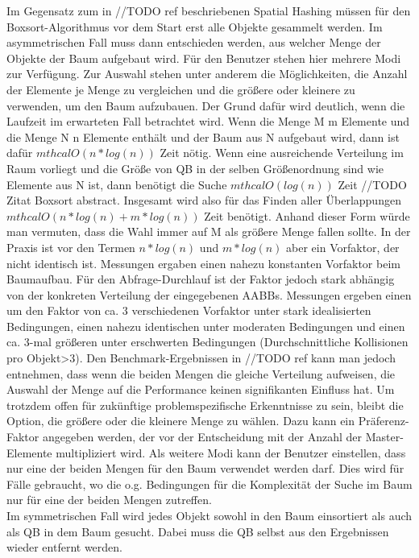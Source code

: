 Im Gegensatz zum in //TODO ref beschriebenen Spatial Hashing müssen für den Boxsort-Algorithmus vor dem Start erst alle Objekte gesammelt werden. Im asymmetrischen Fall muss dann entschieden werden, aus welcher Menge der Objekte der Baum aufgebaut wird. Für den Benutzer stehen hier mehrere Modi zur Verfügung. Zur Auswahl stehen unter anderem die Möglichkeiten, die Anzahl der Elemente je Menge zu vergleichen und die größere oder kleinere zu verwenden, um den Baum aufzubauen. Der Grund dafür wird deutlich, wenn die Laufzeit im erwarteten Fall betrachtet wird. Wenn die Menge M m Elemente und die Menge N n Elemente enthält und der Baum aus N aufgebaut wird, dann ist dafür $mthcal{O}(n*log(n))$ Zeit nötig. Wenn eine ausreichende Verteilung im Raum vorliegt und die Größe von QB in der selben Größenordnung sind wie Elemente aus N ist, dann benötigt die Suche $mthcal{O}(log(n))$ Zeit //TODO Zitat Boxsort abstract. Insgesamt wird also für das Finden aller Überlappungen $mthcal{O}(n*log(n)+m*log(n))$ Zeit benötigt. Anhand dieser Form würde man vermuten, dass die Wahl immer auf M als größere Menge fallen sollte. In der Praxis ist vor den Termen $n*log(n)$ und $m*log(n)$ aber ein Vorfaktor, der nicht identisch ist. Messungen ergaben einen nahezu konstanten Vorfaktor beim Baumaufbau. Für den Abfrage-Durchlauf ist der Faktor jedoch stark abhängig von der konkreten Verteilung der eingegebenen AABBs. Messungen ergeben einen um den Faktor von ca. 3 verschiedenen Vorfaktor unter stark idealisierten Bedingungen, einen nahezu identischen unter moderaten Bedingungen und einen ca. 3-mal größeren unter erschwerten Bedingungen (Durchschnittliche Kollisionen pro Objekt>3). Den Benchmark-Ergebnissen in //TODO ref kann man jedoch entnehmen, dass wenn die beiden Mengen die gleiche Verteilung aufweisen, die Auswahl der Menge auf die Performance keinen signifikanten Einfluss hat. Um trotzdem offen für zukünftige problemspezifische Erkenntnisse zu sein, bleibt die Option, die größere oder die kleinere Menge zu wählen. Dazu kann ein Präferenz-Faktor angegeben werden, der vor der Entscheidung mit der Anzahl der Master-Elemente multipliziert wird. Als weitere Modi kann der Benutzer einstellen, dass nur eine der beiden Mengen für den Baum verwendet werden darf. Dies wird für Fälle gebraucht, wo die o.g. Bedingungen für die Komplexität der Suche im Baum nur für eine der beiden Mengen zutreffen.\\
Im symmetrischen Fall wird jedes Objekt sowohl in den Baum einsortiert als auch als QB in dem Baum gesucht. Dabei muss die QB selbst aus den Ergebnissen wieder entfernt werden.\\

